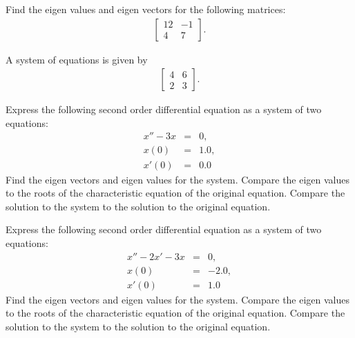 

\begin{problem}
\item 

  \begin{subproblem}
  \item Find the eigen values and eigen vectors for the following matrices:
    \begin{eqnarray*}
      \left[
        \begin{array}{rr}
          12 & -1 \\
          4 & 7
        \end{array}
      \right].
    \end{eqnarray*}
    \vfill

  \item A system of equations is given by
    \begin{eqnarray*}
      \left[
        \begin{array}{rr}
          4 & 6 \\
          2 & 3
        \end{array}
      \right].
    \end{eqnarray*}
    \vfill
      
  \end{subproblem}
\end{problem}

\begin{problem}
\item Express the following second order differential equation as a
  system of two equations:
  \begin{eqnarray*}
    x'' - 3x & = & 0, \\
    x(0) & = & 1.0, \\
    x'(0) & = & 0.0
  \end{eqnarray*}
  Find the eigen vectors and eigen values for the system. Compare the
  eigen values to the roots of the characteristic equation of the
  original equation. Compare the solution to the system to the
  solution to the original equation.

  \vfill



  \clearpage

\item Express the following second order differential equation as a
  system of two equations:
  \begin{eqnarray*}
    x'' - 2x' - 3x & = & 0, \\
    x(0) & = & -2.0, \\
    x'(0) & = & 1.0
  \end{eqnarray*}
    Find the eigen vectors and eigen values for the system. Compare
    the eigen values to the roots of the characteristic equation of
    the original equation. Compare the solution to the system to the
    solution to the original equation.

    \vfill


  \end{problem}


